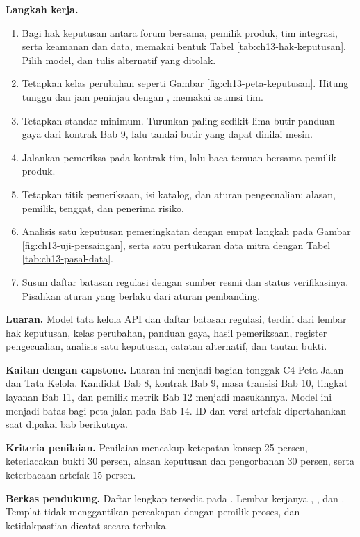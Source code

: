 \textbf{Langkah kerja.}
\begin{enumerate}
  \item Bagi hak keputusan antara forum bersama, pemilik produk, tim integrasi, serta keamanan dan data, memakai bentuk Tabel \ref{tab:ch13-hak-keputusan}. Pilih model, dan tulis alternatif yang ditolak.
  \item Tetapkan kelas perubahan seperti Gambar \ref{fig:ch13-peta-keputusan}. Hitung tunggu dan jam peninjau dengan , memakai asumsi tim.
  \item Tetapkan standar minimum. Turunkan paling sedikit lima butir panduan gaya dari kontrak Bab 9, lalu tandai butir yang dapat dinilai mesin.
  \item Jalankan pemeriksa pada kontrak tim, lalu baca temuan bersama pemilik produk.
  \item Tetapkan titik pemeriksaan, isi katalog, dan aturan pengecualian: alasan, pemilik, tenggat, dan penerima risiko.
  \item Analisis satu keputusan pemeringkatan dengan empat langkah pada Gambar \ref{fig:ch13-uji-persaingan}, serta satu pertukaran data mitra dengan Tabel \ref{tab:ch13-pasal-data}.
  \item Susun daftar batasan regulasi dengan sumber resmi dan status verifikasinya. Pisahkan aturan yang berlaku dari aturan pembanding.
\end{enumerate}

\textbf{Luaran.} Model tata kelola API dan daftar batasan regulasi, terdiri dari lembar hak keputusan, kelas perubahan, panduan gaya, hasil pemeriksaan, register pengecualian, analisis satu keputusan, catatan alternatif, dan tautan bukti.

\textbf{Kaitan dengan capstone.} Luaran ini menjadi bagian tonggak C4 Peta Jalan dan Tata Kelola. Kandidat Bab 8, kontrak Bab 9, masa transisi Bab 10, tingkat layanan Bab 11, dan pemilik metrik Bab 12 menjadi masukannya. Model ini menjadi batas bagi peta jalan pada Bab 14. ID dan versi artefak dipertahankan saat dipakai bab berikutnya.

\textbf{Kriteria penilaian.} Penilaian mencakup ketepatan konsep 25 persen, keterlacakan bukti 30 persen, alasan keputusan dan pengorbanan 30 persen, serta keterbacaan artefak 15 persen.

\textbf{Berkas pendukung.} Daftar lengkap tersedia pada . Lembar kerjanya , , dan . Templat tidak menggantikan percakapan dengan pemilik proses, dan ketidakpastian dicatat secara terbuka.

